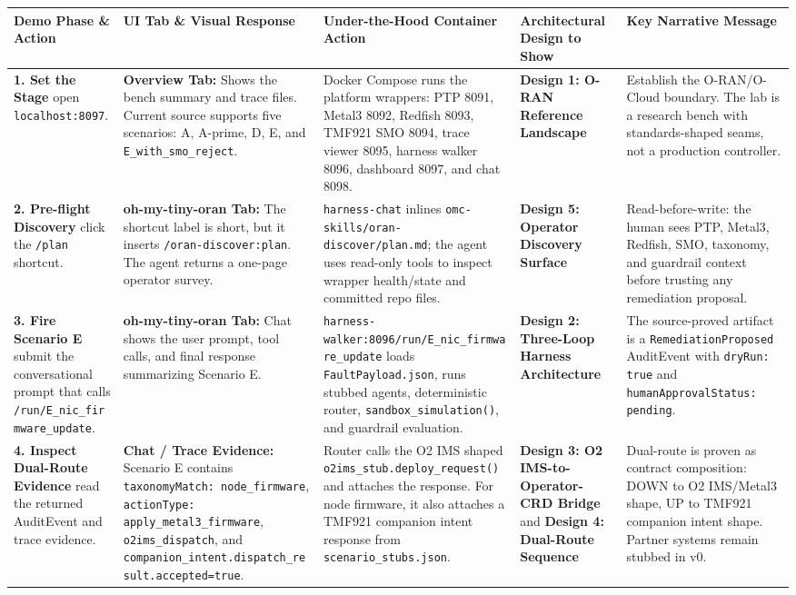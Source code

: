\documentclass[10pt,a4paper]{article}
\begin{document}
\begin{table}[htbp]
\centering
\scriptsize
\begin{tabularx}{\textwidth}{p{3.0cm} p{4.2cm} p{4.3cm} p{3.2cm} X}
\toprule
\textbf{Demo Phase \& Action} & \textbf{UI Tab \& Visual Response} & \textbf{Under-the-Hood Container Action} & \textbf{Architectural Design to Show} & \textbf{Key Narrative Message} \\
\midrule
\textbf{1. Set the Stage} \newline open \texttt{localhost:8097}. & \textbf{Overview Tab:} Shows the bench summary and trace files. Current source supports five scenarios: A, A-prime, D, E, and \texttt{E\_with\_smo\_reject}. & Docker Compose runs the platform wrappers: PTP 8091, Metal3 8092, Redfish 8093, TMF921 SMO 8094, trace viewer 8095, harness walker 8096, dashboard 8097, and chat 8098. & \textbf{Design 1: O-RAN Reference Landscape} & Establish the O-RAN/O-Cloud boundary. The lab is a research bench with standards-shaped seams, not a production controller. \\
\addlinespace
\textbf{2. Pre-flight Discovery} \newline click the \texttt{/plan} shortcut. & \textbf{oh-my-tiny-oran Tab:} The shortcut label is short, but it inserts \texttt{/oran-discover:plan}. The agent returns a one-page operator survey. & \texttt{harness-chat} inlines \texttt{omc-skills/oran-discover/plan.md}; the agent uses read-only tools to inspect wrapper health/state and committed repo files. & \textbf{Design 5: Operator Discovery Surface} & Read-before-write: the human sees PTP, Metal3, Redfish, SMO, taxonomy, and guardrail context before trusting any remediation proposal. \\
\addlinespace
\textbf{3. Fire Scenario E} \newline submit the conversational prompt that calls \texttt{/run/E\_nic\_firmware\_update}. & \textbf{oh-my-tiny-oran Tab:} Chat shows the user prompt, tool calls, and final response summarizing Scenario E. & \texttt{harness-walker:8096/run/E\_nic\_firmware\_update} loads \texttt{FaultPayload.json}, runs stubbed agents, deterministic router, \texttt{sandbox\_simulation()}, and guardrail evaluation. & \textbf{Design 2: Three-Loop Harness Architecture} & The source-proved artifact is a \texttt{RemediationProposed} AuditEvent with \texttt{dryRun: true} and \texttt{humanApprovalStatus: pending}. \\
\addlinespace
\textbf{4. Inspect Dual-Route Evidence} \newline read the returned AuditEvent and trace evidence. & \textbf{Chat / Trace Evidence:} Scenario E contains \texttt{taxonomyMatch: node\_firmware}, \texttt{actionType: apply\_metal3\_firmware}, \texttt{o2ims\_dispatch}, and \texttt{companion\_intent.dispatch\_result.accepted=true}. & Router calls the O2 IMS shaped \texttt{o2ims\_stub.deploy\_request()} and attaches the response. For node firmware, it also attaches a TMF921 companion intent response from \texttt{scenario\_stubs.json}. & \textbf{Design 3: O2 IMS-to-Operator-CRD Bridge} and \textbf{Design 4: Dual-Route Sequence} & Dual-route is proven as contract composition: DOWN to O2 IMS/Metal3 shape, UP to TMF921 companion intent shape. Partner systems remain stubbed in v0. \\

\end{tabularx}
\end{table}
\end{document}
